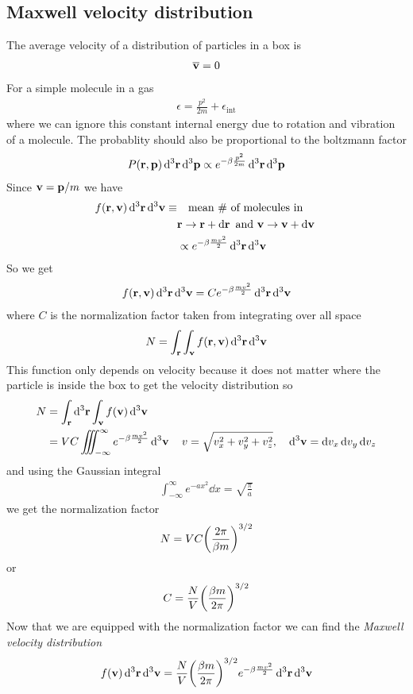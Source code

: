 \documentclass[../main.tex]{subfiles}
\begin{document}
\subsection{Maxwell velocity distribution}
The average velocity of a distribution of particles in a box is
\begin{align*}
    \overline {\vb v} = 0
\end{align*}
For a simple molecule in a gas
\begin{align*}
    \epsilon = \frac{p^2}{2m} + \epsilon_\text{int}
\end{align*}
where we can ignore this constant internal energy due to rotation and vibration of a molecule.
The probablity should also be proportional to the boltzmann factor
\begin{align*}
    P(\vb r, \vb p)\dd[3]{\vb r} \dd[3]{\vb p} \propto e^{-\beta \frac{p^2}{2m}} \dd[3]{\vb r} \dd[3]{\vb p}
\end{align*}
Since $\vb v = \vb p / m$ we have
\begin{align*}
    f(\vb r, \vb v) \dd[3]{\vb r} \dd[3]{\vb v} \equiv &\qqtext{mean \# of molecules in } \\
    &\vb r \to \vb r + \dd{\vb r} \text{ and } \vb v \to \vb v + \dd{\vb v} \\
    &\propto e^{-\beta \frac{m v^2}{2}} \dd[3]{\vb r} \dd[3]{\vb v}
\end{align*}
So we get
\begin{align*}
    f(\vb r, \vb v) \dd[3]{\vb r} \dd[3]{\vb v} = C e^{-\beta \frac{m v^2}{2}} \dd[3]{\vb r} \dd[3]{\vb v}
\end{align*}
where $C$ is the normalization factor taken from integrating over all space
\begin{align*}
    N = \int_{\vb r} \int_{\vb v} f(\vb r, \vb v) \dd[3]{\vb r} \dd[3]{\vb v}
\end{align*}
This function only depends on velocity because it does not matter where the particle is inside the box to get the velocity distribution so
\begin{align*}
    N &= \int_{\vb r} \dd[3]{\vb r} \int_{\vb v} f(\vb v) \dd[3]{\vb v} \\
    &= V C\iiint_{-\infty}^\infty e^{-\beta \frac{m v^2}{2}} \dd[3]{\vb v} \quad v = \sqrt{v_x^2 + v_y^2 + v_z^2}, \quad \dd[3]{\vb v} = \dd{v_x} \dd{v_y} \dd{v_z}
\end{align*}
and using the Gaussian integral
\begin{align*}
    \int_{-\infty}^\infty e^{-ax^2} \dd{x} = \sqrt{\frac{\pi}{a}}
\end{align*}
we get the normalization factor
\begin{align*}
    N = V C \qt(\frac{2\pi}{\beta m})^{3/2}
\end{align*}
or
\begin{align*}
    C = \frac{N}{V} \qt(\frac{\beta m}{2\pi})^{3/2}
\end{align*}
Now that we are equipped with the normalization factor we can find the \emph{Maxwell velocity distribution}
\begin{align*}
    f(\vb v) \dd[3]{\vb r} \dd[3]{\vb v} = \frac{N}{V} \qt(\frac{\beta m}{2\pi})^{3/2} e^{-\beta \frac{m v^2}{2}} \dd[3]{\vb r} \dd[3]{\vb v}
\end{align*}
\end{document}
